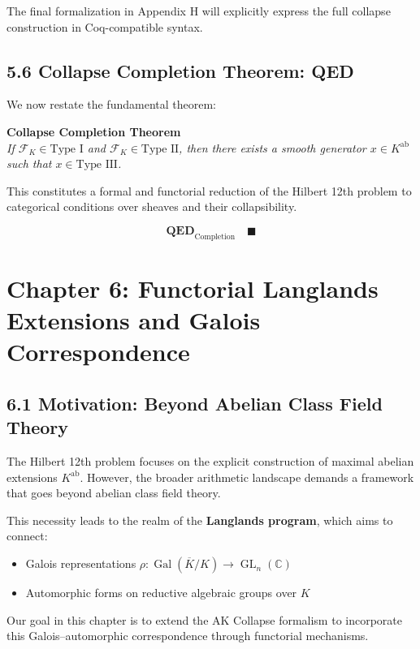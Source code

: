 \documentclass[11pt]{article}
\begin{document}
The final formalization in Appendix H will explicitly express the full collapse construction in Coq-compatible syntax.

\subsection{5.6 Collapse Completion Theorem: QED}

We now restate the fundamental theorem:

\begin{center}
\textbf{Collapse Completion Theorem}  
\\[0.5em]
\textit{
If \( \mathcal{F}_K \in \text{Type I} \) and \( \mathcal{F}_K \in \text{Type II} \), then there exists a smooth generator \( x \in K^{\mathrm{ab}} \) such that \( x \in \text{Type III} \).
}
\end{center}

This constitutes a formal and functorial reduction of the Hilbert 12th problem to categorical conditions over sheaves and their collapsibility.

\[
\textbf{QED}_{\mathrm{Completion}} \quad \blacksquare
\]



\section{Chapter 6: Functorial Langlands Extensions and Galois Correspondence}

\subsection{6.1 Motivation: Beyond Abelian Class Field Theory}

The Hilbert 12th problem focuses on the explicit construction of maximal abelian extensions \( K^{\mathrm{ab}} \).  
However, the broader arithmetic landscape demands a framework that goes beyond abelian class field theory.

This necessity leads to the realm of the \textbf{Langlands program}, which aims to connect:
\begin{itemize}
    \item Galois representations \( \rho: \operatorname{Gal}(\overline{K}/K) \rightarrow \operatorname{GL}_n(\mathbb{C}) \)
    \item Automorphic forms on reductive algebraic groups over \( K \)
\end{itemize}

Our goal in this chapter is to extend the AK Collapse formalism to incorporate this Galois–automorphic correspondence through functorial mechanisms.
\end{document}
